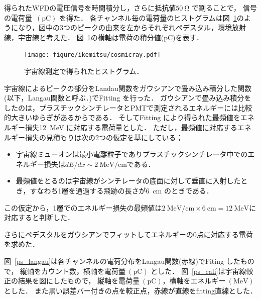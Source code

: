 得られたWFDの電圧信号を時間積分し，さらに抵抗値$50~\mathrm{\Omega}$ で割ることで，
信号の電荷量~$(\mathrm{pC})$ を得た．
各チャンネル毎の電荷量のヒストグラムは図~\ref{cosmicray}のようになり，図中の3つのピークの由来を左からそれぞれペデスタル，環境放射線，宇宙線と考えた．
図~\ref{cosmicray}の横軸は電荷の積分値($\mathrm{pC}$)を表す．
 \begin{figure}[H]
  \centering
  \texttt{[image: figure/ikemitsu/cosmicray.pdf]}
  \caption{宇宙線測定で得られたヒストグラム．}
  \label{cosmicray}
 \end{figure}%

宇宙線によるピークの部分をLandau関数をガウシアンで畳み込み積分した関数(以下，Langau関数と呼ぶ．)でFitting を行った．
ガウシアンで畳み込み積分をしたのは，プラスチックシンチレータとPMTで測定されるエネルギーには比較的大きいゆらぎがあるからである．
そしてFitting により得られた最頻値をエネルギー損失12~MeV に対応する電荷量とした．
ただし，最頻値に対応するエネルギー損失の見積もりは次の2つの仮定を基にしている；
\begin{itemize}
 \item 宇宙線ミューオンは最小電離粒子でありプラスチックシンチレータ中でのエネルギー損失は$dE/dx\sim 2~\mathrm{MeV/cm }$である．
 \item 最頻値をとるのは宇宙線がシンチレータの底面に対して垂直に入射したとき，すなわち1層を通過する飛跡の長さが6~cm のときである．
\end{itemize}
この仮定から，1層でのエネルギー損失の最頻値は$2~\mathrm{MeV/cm}\times6~\mathrm{cm} = 12~\mathrm{MeV }$に対応すると判断した．\cite{leo}

さらにペデスタルをガウシアンでフィットしてエネルギーの0点に対応する電荷を求めた．

図~\ref{ps_langau}は各チャンネルの電荷分布をLangau関数(赤線)でFiting したもので，
縦軸をカウント数，横軸を電荷量$~(\mathrm{pC})$ とした．
図~\ref{ps_cali}は宇宙線較正の結果を図にしたもので，
縦軸を電荷量$~(\mathrm{pC})$，横軸をエネルギー$~(\mathrm{MeV})$ とした．
また黒い誤差バー付きの点を較正点，赤線が直線をfitting直線とした．

